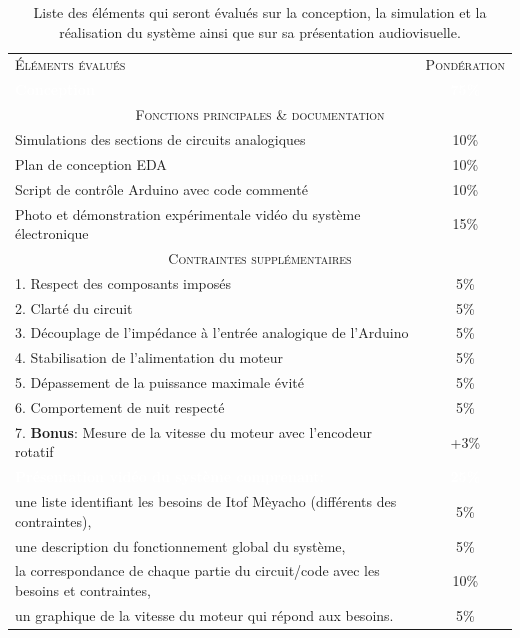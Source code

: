 \documentclass[english,french,12pt]{article}
\begin{document}
\renewcommand{\arraystretch}{1.5}
\begin{table}[h]
\centering
    \begin{tabular}{l c}
    \hline
     \textsc{Éléments évalués} & \textsc{Pondération}\\
     \rowcolor{black} \textcolor{white}{\textbf{Conception}} & \textcolor{white}{\textbf{75\%}}\\
     \multicolumn{2}{c}{\textsc{Fonctions principales \& documentation}}\\
     \hline
     Simulations des sections de circuits analogiques & 10\%\\
     Plan de conception EDA & 10\%\\
     Script de contrôle Arduino avec code commenté & 10\%\\
     Photo et démonstration expérimentale vidéo du système électronique & 15\%\\
     \hline
     \multicolumn{2}{c}{\textsc{Contraintes supplémentaires}}\\
     \hline
     1. Respect des composants imposés & 5\%\\
     2. Clarté du circuit & 5\%\\
     3. Découplage de l'impédance à l'entrée analogique de l'Arduino & 5\%\\
     4. Stabilisation de l'alimentation du moteur & 5\%\\
     5. Dépassement de la puissance maximale évité & 5\%\\
     6. Comportement de nuit respecté & 5\%\\
     7. \textbf{Bonus}: Mesure de la vitesse du moteur avec l'encodeur rotatif & +3\%\\ 
     \rowcolor{black} \textcolor{white}{\textbf{Présentation vidéo du système comprenant:}} & \textcolor{white}{\textbf{25\%}}\\
     une liste identifiant les besoins de Itof Mèyacho (différents des contraintes), & 5\%\\
     une description du fonctionnement global du système, & 5\%\\
     la correspondance de chaque partie du circuit/code avec les besoins et contraintes, & 10\%\\
     un graphique de la vitesse du moteur qui répond aux besoins. & 5\%\\
     \hline
    \end{tabular}
\caption{Liste des éléments qui seront évalués sur la conception, la simulation et la réalisation du système ainsi que sur sa présentation audiovisuelle.}
\label{tab:1}
\end{table}
\end{document}
